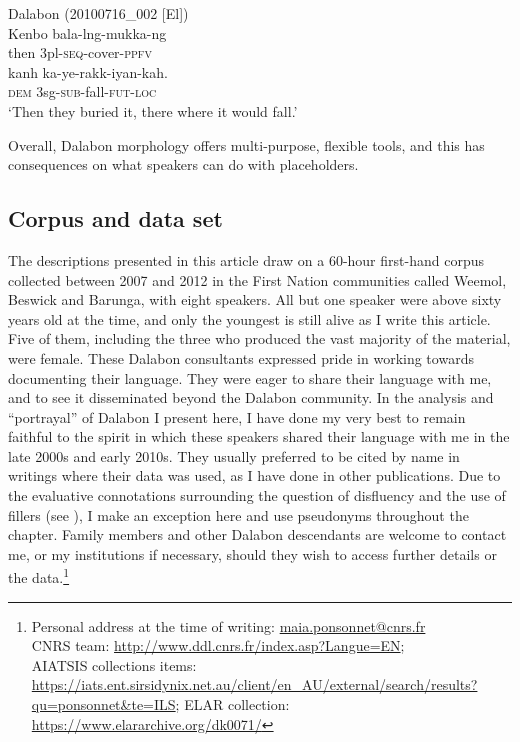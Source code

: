 \documentclass[output=paper]{langscibook}
\begin{document}
\ea
{ \label{ex:ponsonnet:8}Dalabon (20100716\_002 [El])}\\
\gll Kenbo   bala-lng-mukka-ng \\
then      3pl-\textsc{seq}{}-cover-\textsc{ppfv}\\
\gll kanh   ka-ye-rakk-iyan-kah. \\
\textsc{dem}       3sg-\textsc{sub}{}-fall-\textsc{fut-loc}\\
\glt ‘Then they buried it, there where it would fall.’
\z 

Overall, Dalabon morphology offers multi-purpose, flexible tools, and this has consequences on what speakers can do with placeholders. 

\subsection{Corpus and data set}
\label{sec:ponsonnet:2.2}
The descriptions presented in this article draw on a 60-hour first-hand corpus collected between 2007 and 2012 in the First Nation communities called Weemol, Beswick and Barunga, with eight speakers. All but one speaker were above sixty years old at the time, and only the youngest is still alive as I write this article. Five of them, including the three who produced the vast majority of the material, were female. These Dalabon consultants expressed pride in working towards documenting their language. They were eager to share their language with me, and to see it disseminated beyond the Dalabon community. In the analysis and “portrayal” of Dalabon I present here, I have done my very best to remain faithful to the spirit in which these speakers shared their language with me in the late 2000s and early 2010s. They usually preferred to be cited by name in writings where their data was used, as I have done in other publications. Due to the evaluative connotations surrounding the question of disfluency and the use of fillers (see ), I make an exception here and use pseudonyms throughout the chapter. Family members and other Dalabon descendants are welcome to contact me, or my institutions if necessary, should they wish to access further details or the data.\footnote{Personal address at the time of writing: \href{mailto:maia.ponsonnet@cnrs.fr}{maia.ponsonnet@cnrs.fr}\\
CNRS team: \url{http://www.ddl.cnrs.fr/index.asp?Langue=EN};\\
AIATSIS collections items: \url{https://iats.ent.sirsidynix.net.au/client/en_AU/external/search/results?qu=ponsonnet&te=ILS}; ELAR collection: \url{https://www.elararchive.org/dk0071/}}
\end{document}
